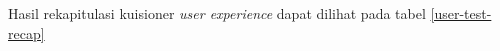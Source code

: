 Hasil rekapitulasi kuisioner \textit{user experience} dapat dilihat pada tabel \ref{user-test-recap}
